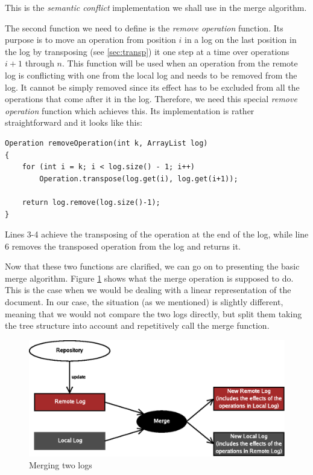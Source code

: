 This is the \emph{semantic conflict} implementation we shall use in the merge algorithm.

The second function we need to define is the \emph{remove operation} function. Its purpose is
to move an operation from position $i$ in a log on the last position in the log by transposing
(see \ref{sec:transp}) it one step at a time over operations $i+1$ through $n$. This function
will be used when an operation from the remote log is conflicting with one from the local
log and needs to be removed from the log. It cannot be simply removed since its effect has
to be excluded from all the operations that come after it in the log. Therefore, we need this
special \emph{remove operation} function which achieves this. Its implementation is rather
straightforward and it looks like this:

\lstset{linewidth=340pt}
\begin{lstlisting}
Operation removeOperation(int k, ArrayList log)
{
	for (int i = k; i < log.size() - 1; i++)
		Operation.transpose(log.get(i), log.get(i+1));

	return log.remove(log.size()-1);
}
\end{lstlisting}
\lstset{linewidth=450pt}

Lines 3-4 achieve the transposing of the operation at the end of the log, while line 6 removes
the transposed operation from the log and returns it.

Now that these two functions are clarified, we can go on to presenting the basic merge
algorithm. Figure \ref{fig:merge} shows what the merge operation is supposed to do. This is the case
when we would be dealing with a linear representation of the document. In our case, the situation
(as we mentioned) is slightly different, meaning that we would not compare the two logs directly,
but split them taking the tree structure into account and repetitively call the merge function.

\begin{figure}
\begin{center}
\includegraphics{img/merge.eps}
\end{center}
\caption{Merging two logs}
\label{fig:merge}
\end{figure}
 
